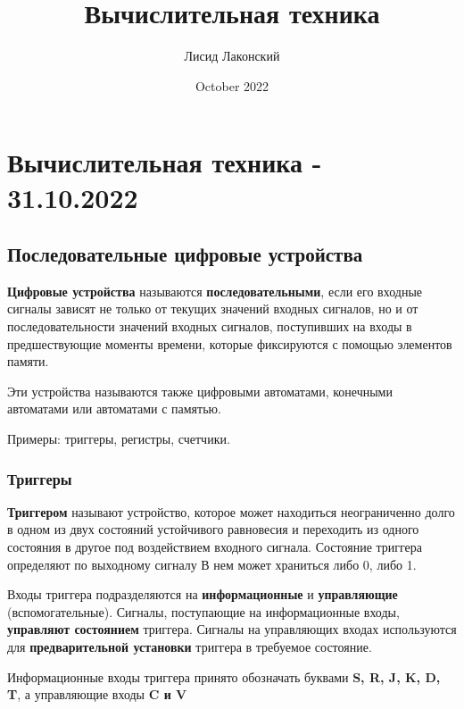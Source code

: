 \documentclass{article}
\title{Вычислительная техника}
\author{Лисид Лаконский}
\date{October 2022}
\begin{document}
\maketitle
\tableofcontents
\pagebreak

\section{Вычислительная техника - 31.10.2022}

\subsection{Последовательные цифровые устройства}

\begin{flushleft}

\textbf{Цифровые устройства} называются \textbf{последовательными}, если его входные сигналы зависят не только от текущих значений входных сигналов, но и от последовательности значений входных сигналов, поступивших на входы в предшествующие моменты времени, которые фиксируются с помощью элементов памяти.

\hfill

Эти устройства называются также цифровыми автоматами, конечными автоматами или автоматами с памятью.

\hfill

Примеры: триггеры, регистры, счетчики.

\pagebreak
\subsubsection{Триггеры}

\textbf{Триггером} называют устройство, которое может находиться неограниченно долго в одном из двух состояний устойчивого равновесия и переходить из одного состояния в другое под воздействием входного сигнала. Состояние триггера определяют по выходному сигналу В нем может храниться либо 0, либо 1.

\hfill

Входы триггера подразделяются на \textbf{информационные} и \textbf{управляющие} (вспомогательные). Сигналы, поступающие на информационные входы, \textbf{управляют состоянием} триггера. Сигналы на управляющих входах используются для \textbf{предварительной установки} триггера в требуемое состояние.

\hfill

Информационные входы триггера принято обозначать буквами \textbf{S, R, J, K, D, T}, а управляющие входы \textbf{C и V}


\end{flushleft}
\end{document}
